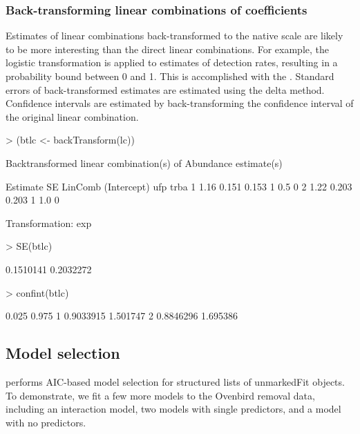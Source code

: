 \documentclass[article,shortnames]{jss}
\begin{document}
{\subsubsection{Back-transforming linear combinations of coefficients}

Estimates of linear combinations back-transformed to the native scale
are likely to be more interesting than the direct linear combinations.
For example, the logistic transformation is applied to estimates of
detection rates, resulting in a probability bound between 0 and
1. This is accomplished with the .  Standard
errors of back-transformed estimates are estimated using the delta
method.  Confidence intervals are estimated by back-transforming the
confidence interval of the original linear combination.

\begin{Schunk}
\begin{Sinput}
> (btlc <- backTransform(lc))
\end{Sinput}
\begin{Soutput}
Backtransformed linear combination(s) of Abundance estimate(s)

  Estimate    SE LinComb (Intercept) ufp trba
1     1.16 0.151   0.153           1 0.5    0
2     1.22 0.203   0.203           1 1.0    0

Transformation: exp 
\end{Soutput}
\begin{Sinput}
> SE(btlc)
\end{Sinput}
\begin{Soutput}
[1] 0.1510141 0.2032272
\end{Soutput}
\begin{Sinput}
> confint(btlc)
\end{Sinput}
\begin{Soutput}
      0.025    0.975
1 0.9033915 1.501747
2 0.8846296 1.695386
\end{Soutput}
\end{Schunk}

\subsection{Model selection}

 performs AIC-based model selection for structured lists of
unmarkedFit objects.  To demonstrate, we fit a few more models to the Ovenbird
removal data, including an interaction model, two models with
single predictors, and a model with no predictors.

}
\end{document}
